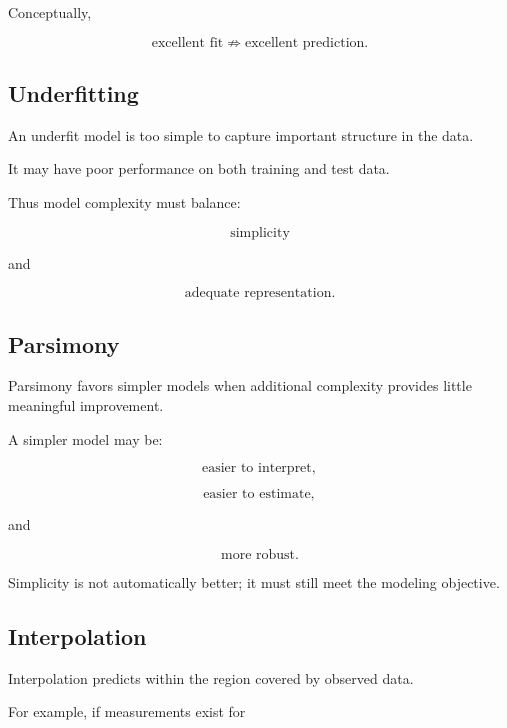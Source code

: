 Conceptually,

\[
\boxed{
\text{excellent fit}
\not\Rightarrow
\text{excellent prediction}.
}
\]

\subsection{Underfitting}
\label{subsec:model-underfitting}

An underfit model is too simple to capture important structure in the data.

It may have poor performance on both training and test data.

Thus model complexity must balance:

\[
\boxed{
\text{simplicity}
}
\]

and

\[
\boxed{
\text{adequate representation}.
}
\]

\subsection{Parsimony}
\label{subsec:model-parsimony}

Parsimony favors simpler models when additional complexity provides little
meaningful improvement.

A simpler model may be:

\[
\boxed{
\text{easier to interpret},
}
\]

\[
\boxed{
\text{easier to estimate},
}
\]

and

\[
\boxed{
\text{more robust}.
}
\]

Simplicity is not automatically better; it must still meet the modeling
objective.

\subsection{Interpolation}
\label{subsec:model-interpolation}

Interpolation predicts within the region covered by observed data.

For example, if measurements exist for


